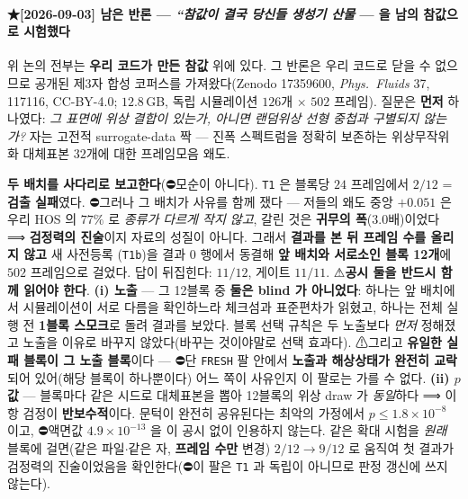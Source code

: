 \documentclass[11pt]{report}
\numberwithin{equation}{chapter}
\numberwithin{figure}{chapter}
\numberwithin{table}{chapter}
\begin{document}
\paragraph{★[2026-09-03] 남은 반론 --- \emph{``참값이 결국 당신들 생성기 산물} ---
을 \textbf{남의 참값}으로 시험했다}
위 논의 전부는 \textbf{우리 코드가 만든 참값} 위에 있다. 그 반론은 우리 코드로 닫을 수
없으므로 공개된 제3자 합성 코퍼스를 가져왔다(Zenodo 17359600, \emph{Phys.\ Fluids} 37,
117116, CC-BY-4.0; $12.8$\,GB, 독립 시뮬레이션 $126$개 $\times$ $502$ 프레임).
질문은 \textbf{먼저} 하나였다: \emph{그 표면에 위상 결합이 있는가, 아니면 랜덤위상 선형
중첩과 구별되지 않는가?} 자는 고전적 surrogate-data 짝 --- 진폭 스펙트럼을 정확히 보존하는
위상무작위화 대체표본 $32$개에 대한 프레임모음 왜도.

\textbf{두 배치를 사다리로 보고한다}(⛔모순이 아니다). \texttt{T1} 은 블록당 $24$
프레임에서 $2/12$ = \textbf{검출 실패}였다. ⛔그러나 그 배치가 사유를 함께 쟀다 ---
저들의 왜도 중앙 $+0.051$ 은 우리 HOS 의 $77\%$ 로 \emph{종류가 다르게 작지 않고},
갈린 것은 \textbf{귀무의 폭}($3.0$배)이었다 ⟹ \textbf{검정력의 진술}이지 자료의 성질이
아니다. 그래서 \textbf{결과를 본 뒤 프레임 수를 올리지 않고} 새 사전등록
(\texttt{T1b})을 결과 $0$ 행에서 동결해 \textbf{앞 배치와 서로소인 블록 12개}에
$502$ 프레임으로 걸었다. 답이 뒤집힌다: \textbf{$11/12$}, 게이트 $11/11$.
⚠\textbf{공시 둘을 반드시 함께 읽어야 한다}. \textbf{(i) 노출} --- 그 12블록 중
\textbf{둘은 blind 가 아니었다}: 하나는 앞 배치에서 시뮬레이션이 서로 다름을
확인하느라 체크섬과 표준편차가 읽혔고, 하나는 전체 실행 전 \textbf{1블록
스모크}로 돌려 결과를 보았다. 블록 선택 규칙은 두 노출보다 \emph{먼저} 정해졌고
노출을 이유로 바꾸지 않았다(바꾸는 것이야말로 선택 효과다).
⚠그리고 \textbf{유일한 실패 블록이 그 노출 블록}이다 --- ⛔단 \texttt{FRESH} 팔
안에서 \textbf{노출과 해상상태가 완전히 교락}되어 있어(해당 블록이 하나뿐이다)
어느 쪽이 사유인지 이 팔로는 가를 수 없다.
\textbf{(ii) $p$ 값} --- 블록마다 같은 시드로 대체표본을 뽑아 12블록의 위상 draw 가
\emph{동일}하다 ⟹ 이항 검정이 \textbf{반보수적}이다. 문턱이 완전히 공유된다는
최악의 가정에서 $p \le 1.8\times10^{-8}$ 이고, ⛔액면값
$4.9\times10^{-13}$ 을 이 공시 없이 인용하지 않는다. 같은 확대 시험을 \emph{원래} 블록에 걸면(같은 파일$\cdot$같은 자,
\textbf{프레임 수만} 변경) $2/12 \to 9/12$ 로 움직여 첫 결과가 검정력의 진술이었음을
확인한다(⛔이 팔은 \texttt{T1} 과 독립이 아니므로 판정 갱신에 쓰지 않는다).
\end{document}
